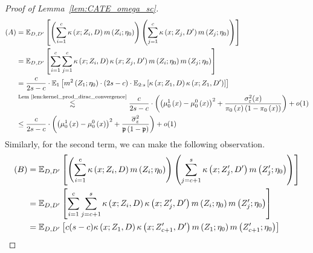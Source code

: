 \begin{proof}[Proof of Lemma~\ref{lem:CATE_omega_sc}]
    \begin{equation}
        \begin{aligned}
            (A)
            & = \mathbb{E}_{D, D^{\prime}}\left[\left(\sum_{i = 1}^{c} \kappa\left(x; Z_{i}, D\right) m\left(Z_{i}; \eta_{0}\right)\right)
            \left(\sum_{j = 1}^{c} \kappa\left(x; Z_{j}, D^{\prime}\right) m\left(Z_{j}; \eta_{0}\right)\right)\right] \\
			& = \mathbb{E}_{D, D^{\prime}}\left[
				\sum_{i = 1}^{c} \sum_{j = 1}^{c} \kappa\left(x; Z_{i}, D\right)\kappa\left(x; Z_{j}, D^{\prime}\right) m\left(Z_{i}; \eta_{0}\right)m\left(Z_{j}; \eta_{0}\right)
			\right] \\
			& = \frac{c}{2s-c} \cdot \mathbb{E}_{1}\left[m^{2}\left(Z_{1}; \eta_{0}\right) \cdot (2s-c) \cdot \mathbb{E}_{2:s}\left[\kappa\left(x; Z_{1}, D\right)\kappa\left(x; Z_{1}, D^{\prime}\right)\right]\right]\\
            & \overset{\text{Lem \ref{lem:kernel_prod_dirac_convergence}}}{\lesssim} \frac{c}{2s-c} \cdot \left(\left(\mu_{0}^{1}\left(x\right) - \mu_{0}^{0}\left(x\right)\right)^2 + \frac{\sigma_{\varepsilon}^2(x)}{\pi_{0}\left(x\right)\left(1 - \pi_{0}\left(x\right)\right)}\right) + o(1)\\
            & \leq \frac{c}{2s-c} \cdot \left(\left(\mu_{0}^{1}\left(x\right) - \mu_{0}^{0}\left(x\right)\right)^2 + \frac{\overline{\sigma}^2_{\varepsilon}}{\mathfrak{p}\left(1 - \mathfrak{p}\right)}\right) + o(1)
        \end{aligned}
    \end{equation}
	Similarly, for the second term, we can make the following observation.
	\begin{equation}
		\begin{aligned}
			(B) 
			& = \E_{D, D^{\prime}}\left[\left(\sum_{i = 1}^{c} \kappa\left(x; Z_{i}, D\right) m\left(Z_{i}; \eta_{0}\right)\right)
            \left(\sum_{j = c + 1}^{s} \kappa\left(x; Z_{j}^{\prime}, D^{\prime}\right) m\left(Z_{j}^{\prime}; \eta_{0}\right)\right)\right] \\
			& = \E_{D,D^{\prime}}\left[\sum_{i = 1}^{c} \sum_{j = c + 1}^{s}\kappa\left(x; Z_{i}, D\right)\kappa\left(x; Z_{j}^{\prime}, D^{\prime}\right) 
			m\left(Z_{i}; \eta_{0}\right)m\left(Z_{j}^{\prime}; \eta_{0}\right)\right]\\
			& = \E_{D, D^{\prime}}\left[c (s-c) \kappa\left(x; Z_{1}, D\right)\kappa\left(x; Z_{c+1}^{\prime}, D^{\prime}\right) 
			m\left(Z_{1}; \eta_{0}\right) m\left(Z_{c+1}^{\prime}; \eta_{0}\right)\right]\\

\end{aligned}
\end{equation}
\end{proof}
